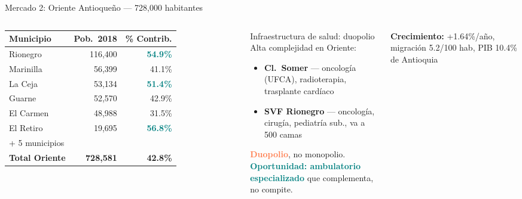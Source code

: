 \documentclass[aspectratio=169, 11pt]{beamer}
\newcommand{\highlight}[1]{\textcolor{teal}{\textbf{#1}}}
\newcommand{\danger}[1]{\textcolor{coral}{\textbf{#1}}}
\newcommand{\src}[1]{\par\vspace{2pt}{\tiny\textcolor{slate}{Fuente: #1}}}
\begin{document}
\begin{frame}{Mercado 2: Oriente Antioqueño --- 728,000 habitantes}

\begin{columns}[T]
{\scriptsize\setlength{\tabcolsep}{3pt}
\begin{tabular}{@{}lrr@{}}
\toprule
\textbf{Municipio} & \textbf{Pob.\ 2018} & \textbf{\% Contrib.} \\
\midrule
\rowcolor{teal!8}
Rionegro & 116,400 & \highlight{54.9\%} \\
Marinilla & 56,399 & 41.1\% \\
\rowcolor{teal!6}
La Ceja & 53,134 & \highlight{51.4\%} \\
Guarne & 52,570 & 42.9\% \\
El Carmen & 48,988 & 31.5\% \\
\rowcolor{teal!6}
El Retiro & 19,695 & \highlight{56.8\%} \\
{\scriptsize + 5 municipios} & & \\
\midrule
\textbf{Total Oriente} & \textbf{728,581} & \textbf{42.8\%} \\
\bottomrule
\end{tabular}
}

\vspace{3pt}
\src{DANE CNPV 2018, RUAF Aseguramiento}

\begin{alertblock}{\small Infraestructura de salud: duopolio}
\footnotesize
Alta complejidad en Oriente:
\begin{itemize}\setlength{\itemsep}{1pt}
  \item \textbf{Cl.\ Somer} --- oncología (UFCA), radioterapia, trasplante cardíaco
  \item \textbf{SVF Rionegro} --- oncología, cirugía, pediatría sub., va a 500 camas
\end{itemize}
\vspace{3pt}
\danger{Duopolio}, no monopolio.\\
\highlight{Oportunidad: ambulatorio especializado} que complementa, no compite.
\end{alertblock}

\vspace{4pt}
{\scriptsize\textbf{Crecimiento:} +1.64\%/año, migración 5.2/100 hab, PIB 10.4\% de Antioquia}
\end{columns}
\end{frame}
\end{document}

